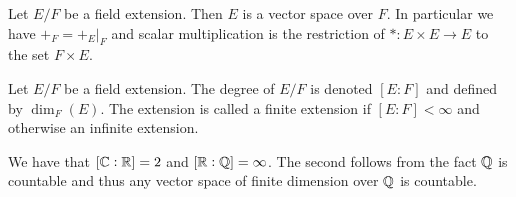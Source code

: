 \documentclass[11pt,a4paper]{article}
\begin{document}
\begin{proposition}
  Let $E/F$ be a field extension.
  Then $E$ is a vector space over $F$.
  In particular we have $+_F = +_E\vert_F$ and scalar multiplication
  is the restriction of $* \colon E \times E \to E$ to the set
  $F \times E$.
\end{proposition}

\begin{definition}
  Let $E/F$ be a field extension.
  The degree of $E/F$ is denoted $[E : F]$ and defined
  by $\dim_F(E)$.
  The extension is called a finite extension if $[E : F] < \infty$
  and otherwise an infinite extension.
\end{definition}
\begin{example}
  We have that $[\mathbb{C} : \mathbb{R}] = 2$ and $[\mathbb{R} : \mathbb{Q}] = \infty$.
  The second follows from the fact $\mathbb{Q}$ is countable and thus any vector
  space of finite dimension over $\mathbb{Q}$ is countable.
\end{example}
\end{document}
